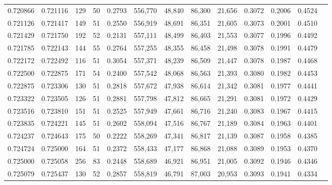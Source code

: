 \begin{tabular}{rrrrrrrrrrrrr}
0.720866 & 0.721116 &    129 &    50 &                                     0.2793 & 556,770 &  48,840 &  86,300 &  21,656 & 0.3072 & 0.2006 & 0.4524 \\
0.721126 & 0.721417 &    149 &    51 &                                     0.2550 & 556,919 &  48,691 &  86,351 &  21,605 & 0.3073 & 0.2001 & 0.4510 \\
0.721429 & 0.721750 &    192 &    52 &                                     0.2131 & 557,111 &  48,499 &  86,403 &  21,553 & 0.3077 & 0.1996 & 0.4492 \\
0.721785 & 0.722143 &    144 &    55 &                                     0.2764 & 557,255 &  48,355 &  86,458 &  21,498 & 0.3078 & 0.1991 & 0.4479 \\
0.722172 & 0.722492 &    116 &    51 &                                     0.3054 & 557,371 &  48,239 &  86,509 &  21,447 & 0.3078 & 0.1987 & 0.4468 \\
0.722500 & 0.722875 &    171 &    54 &                                     0.2400 & 557,542 &  48,068 &  86,563 &  21,393 & 0.3080 & 0.1982 & 0.4453 \\
0.722875 & 0.723306 &    130 &    51 &                                     0.2818 & 557,672 &  47,938 &  86,614 &  21,342 & 0.3081 & 0.1977 & 0.4441 \\
0.723322 & 0.723505 &    126 &    51 &                                     0.2881 & 557,798 &  47,812 &  86,665 &  21,291 & 0.3081 & 0.1972 & 0.4429 \\
0.723516 & 0.723810 &    151 &    51 &                                     0.2525 & 557,949 &  47,661 &  86,716 &  21,240 & 0.3083 & 0.1967 & 0.4415 \\
0.723835 & 0.724221 &    145 &    51 &                                     0.2602 & 558,094 &  47,516 &  86,767 &  21,189 & 0.3084 & 0.1963 & 0.4401 \\
0.724237 & 0.724643 &    175 &    50 &                                     0.2222 & 558,269 &  47,341 &  86,817 &  21,139 & 0.3087 & 0.1958 & 0.4385 \\
0.724724 & 0.725000 &    164 &    51 &                                     0.2372 & 558,433 &  47,177 &  86,868 &  21,088 & 0.3089 & 0.1953 & 0.4370 \\
0.725000 & 0.725058 &    256 &    83 &                                     0.2448 & 558,689 &  46,921 &  86,951 &  21,005 & 0.3092 & 0.1946 & 0.4346 \\
0.725079 & 0.725437 &    130 &    52 &                                     0.2857 & 558,819 &  46,791 &  87,003 &  20,953 & 0.3093 & 0.1941 & 0.4334 \\

\end{tabular}
